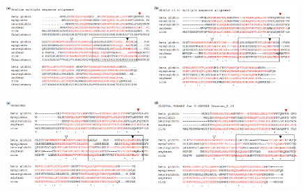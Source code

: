 \begin{frame}

    \begin{figure}[t]
        \raggedleft
        \includegraphics[width=0.49\textwidth]{./img/Comparacion_1.png}
        \raggedright
        \includegraphics[width=0.49\textwidth]{./img/Comparacion_2.png}
    \end{figure}
    \begin{figure}[b]
        \raggedleft
        \includegraphics[width=0.49\textwidth]{./img/Comparacion_3.png}
        \raggedright
        \includegraphics[width=0.49\textwidth]{./img/Comparacion_4.png}
    \end{figure}

\end{frame}